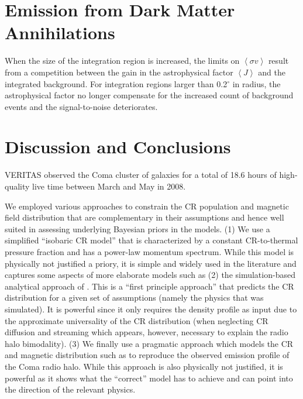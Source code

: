 \documentclass[12pt,manuscript]{aastex}
\newcommand{\expval}[1]{\left\langle #1 \right\rangle}
\begin{document}
\section{Emission from Dark Matter Annihilations}
When the size of the integration region is increased, the limits on $\expval{\sigma v}$ result from a competition between the gain in the astrophysical factor $\expval{J}$ and the integrated background. For integration regions larger than 0.2$^{\circ}$ in radius, the astrophysical factor no longer compensate for the increased count of background events and the signal-to-noise deteriorates. 

\section{Discussion and Conclusions}
VERITAS observed the Coma cluster of galaxies for a total of 18.6 hours of high-quality live time between March and May in 2008. 


We employed various approaches to constrain the CR population and magnetic field distribution that are complementary in their assumptions and hence well suited in assessing underlying Bayesian priors in the models. (1) We use a simplified ``isobaric CR model'' that is characterized by a constant CR-to-thermal pressure fraction and has a power-law momentum spectrum.  While this model is physically not justified a priory, it is simple and widely used in the literature and captures some aspects of more elaborate models such as (2) the simulation-based analytical approach of \citet{article:PinzkePfrommer:2010}. This is a ``first principle approach'' that predicts the CR distribution for a given set of assumptions (namely the physics that was simulated). It is powerful since it only requires the density profile as input due to the approximate universality of the CR distribution (when neglecting CR diffusion and streaming which appears, however, necessary to explain the radio halo bimodality). (3) We finally use a pragmatic approach which models the CR and magnetic distribution such as to reproduce the observed emission profile of the Coma radio halo. While this approach is also physically not justified, it is powerful as it shows what the ``correct'' model has to achieve and can point into the direction of the relevant physics.
\end{document}
